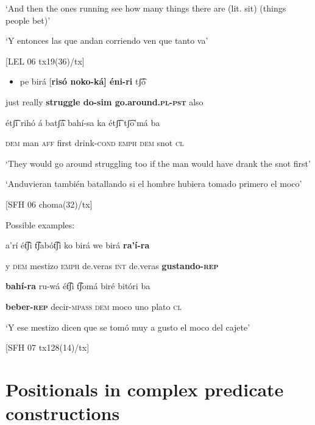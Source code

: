   ‘And then the ones running see how many things there are (lit. sit) (things people bet)’ 

‘Y entonces las que andan corriendo ven que tanto va’

  [LEL 06 tx19(36)/tx]

\begin{itemize}
\item pe   birá   [\textbf{risó     noko-ká]   éni-ri}       tʃ͡ó   
\end{itemize}

    just  really  \textbf{struggle  do-sim  go.around.\textsc{pl-pst}}  also  

    étʃ͡i   rihó   á   batʃ͡á   bahí-sa   ka   étʃ͡i   tʃ͡o’má   ba

    \textsc{dem}  man  \textsc{aff}  first  drink-\textsc{cond  emph  dem}  snot  \textsc{cl}

    ‘They would go around struggling too if the man would have drank the snot first’

    ‘Anduvieran también batallando si el hombre hubiera tomado primero el moco’

    [SFH 06 choma(32)/tx]

Possible examples:

a’rí   ét͡ʃi   t͡ʃabót͡ʃi   ko   birá     we   birá     \textbf{ra’í-ra}   

  y  \textsc{dem} mestizo  \textsc{emph} de.veras  \textsc{int} de.veras  \textbf{gustando-\textsc{rep}}

\textbf{bahí-ra}   ru-wá     ét͡ʃi   t͡ʃomá   biré   bitóri  ba    

\textbf{beber-\textsc{rep}} decir-\textsc{mpass  dem} moco  uno  plato  \textsc{cl}

‘Y ese mestizo dicen que se tomó muy a gusto el moco del cajete’

[SFH 07 tx128(14)/tx]


\section{Positionals in complex predicate constructions}
\label{sec: positionals in complex predicate constructions}

